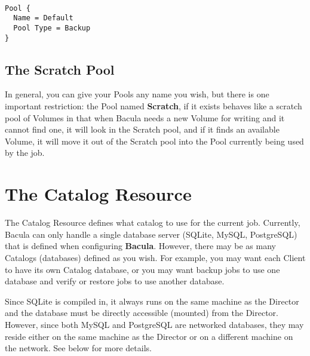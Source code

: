 \footnotesize
\begin{verbatim}
 
Pool {
  Name = Default
  Pool Type = Backup
}
\end{verbatim}
\normalsize

\subsection{The Scratch Pool}
\label{TheScratchPool}
In general, you can give your Pools any name you wish, but there is one 
important restriction: the Pool named {\bf Scratch}, if it exists behaves 
like a scratch pool of Volumes in that when Bacula needs a new Volume for 
writing and it cannot find one, it will look in the Scratch pool, and if
it finds an available Volume, it will move it out of the Scratch pool into
the Pool currently being used by the job.


\section{The Catalog Resource}
\label{CatalogResource}

The Catalog Resource defines what catalog to use for the current job.
Currently, Bacula can only handle a single database server (SQLite, MySQL,
PostgreSQL) that is defined when configuring {\bf Bacula}.  However, there
may be as many Catalogs (databases) defined as you wish.  For example, you
may want each Client to have its own Catalog database, or you may want
backup jobs to use one database and verify or restore jobs to use another
database. 

Since SQLite is compiled in, it always runs on the same machine
as the Director and the database must be directly accessible (mounted) from
the Director.  However, since both MySQL and PostgreSQL are networked
databases, they may reside either on the same machine as the Director
or on a different machine on the network.  See below for more details.


